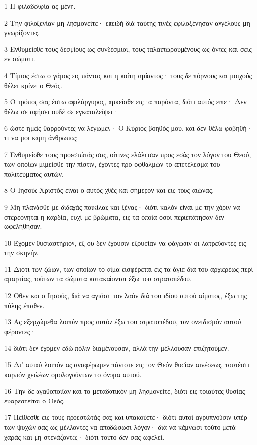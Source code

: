 \par 1 Η φιλαδελφία ας μένη.
\par 2 Την φιλοξενίαν μη λησμονείτε· επειδή διά ταύτης τινές εφιλοξένησαν αγγέλους μη γνωρίζοντες.
\par 3 Ενθυμείσθε τους δεσμίους ως συνδέσμιοι, τους ταλαιπωρουμένους ως όντες και σεις εν σώματι.
\par 4 Τίμιος έστω ο γάμος εις πάντας και η κοίτη αμίαντος· τους δε πόρνους και μοιχούς θέλει κρίνει ο Θεός.
\par 5 Ο τρόπος σας έστω αφιλάργυρος, αρκείσθε εις τα παρόντα, διότι αυτός είπε· Δεν θέλω σε αφήσει ουδέ σε εγκαταλείψει·
\par 6 ώστε ημείς θαρρούντες να λέγωμεν· Ο Κύριος βοηθός μου, και δεν θέλω φοβηθή· τι να μοι κάμη άνθρωπος;
\par 7 Ενθυμείσθε τους προεστώτάς σας, οίτινες ελάλησαν προς εσάς τον λόγον του Θεού, των οποίων μιμείσθε την πίστιν, έχοντες προ οφθαλμών το αποτέλεσμα του πολιτεύματος αυτών.
\par 8 Ο Ιησούς Χριστός είναι ο αυτός χθές και σήμερον και εις τους αιώνας.
\par 9 Μη πλανάσθε με διδαχάς ποικίλας και ξένας· διότι καλόν είναι με την χάριν να στερεόνηται η καρδία, ουχί με βρώματα, εις τα οποία όσοι περιεπάτησαν δεν ωφελήθησαν.
\par 10 Έχομεν θυσιαστήριον, εξ ου δεν έχουσιν εξουσίαν να φάγωσιν οι λατρεύοντες εις την σκηνήν.
\par 11 Διότι των ζώων, των οποίων το αίμα εισφέρεται εις τα άγια διά του αρχιερέως περί αμαρτίας, τούτων τα σώματα κατακαίονται έξω του στρατοπέδου.
\par 12 Όθεν και ο Ιησούς, διά να αγιάση τον λαόν διά του ιδίου αυτού αίματος, έξω της πύλης έπαθεν.
\par 13 Ας εξερχώμεθα λοιπόν προς αυτόν έξω του στρατοπέδου, τον ονειδισμόν αυτού φέροντες·
\par 14 διότι δεν έχομεν εδώ πόλιν διαμένουσαν, αλλά την μέλλουσαν επιζητούμεν.
\par 15 Δι' αυτού λοιπόν ας αναφέρωμεν πάντοτε εις τον Θεόν θυσίαν αινέσεως, τουτέστι καρπόν χειλέων ομολογούντων το όνομα αυτού.
\par 16 Την δε αγαθοποιΐαν και το μεταδοτικόν μη λησμονείτε, διότι εις τοιαύτας θυσίας ευαρεστείται ο Θεός.
\par 17 Πείθεσθε εις τους προεστώτάς σας και υπακούετε· διότι αυτοί αγρυπνούσιν υπέρ των ψυχών σας ως μέλλοντες να αποδώσωσι λόγον· διά να κάμνωσι τούτο μετά χαράς και μη στενάζοντες· διότι τούτο δεν σας ωφελεί.
